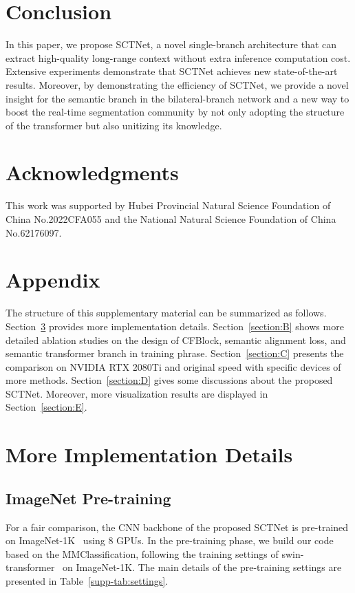 \documentclass[letterpaper]{article} %
\begin{document}
\section{Conclusion}
In this paper, we propose SCTNet, a novel single-branch architecture that can extract high-quality long-range context without extra inference computation cost. Extensive experiments demonstrate that SCTNet achieves new state-of-the-art results. Moreover, by demonstrating the efficiency of SCTNet, we provide a novel insight for the semantic branch in the bilateral-branch network and a new way to boost the real-time segmentation community by not only adopting the structure of the transformer but also unitizing its knowledge.

\section{Acknowledgments}
This work was supported by Hubei Provincial Natural Science Foundation of China No.2022CFA055 and the National Natural Science Foundation of China No.62176097.



\newpage
\appendix


\section*{Appendix} 
The structure of this supplementary material can be summarized as follows. Section~\ref{section:A} provides more implementation details. Section~\ref{section:B} shows more detailed ablation studies on the design of CFBlock, semantic alignment loss, and semantic transformer branch in training phrase. Section~\ref{section:C} presents the comparison on NVIDIA RTX 2080Ti and original speed with specific devices of more methods. Section~\ref{section:D} gives some discussions about the proposed SCTNet. Moreover, more visualization results are displayed in Section~\ref{section:E}.

\section{More Implementation Details}\label{section:A}
\subsection{ImageNet Pre-training}
For a fair comparison, the CNN backbone of the proposed SCTNet is pre-trained on ImageNet-1K~\cite{deng2009imagenet} using 8 GPUs. In the pre-training phase, we build our code based on the MMClassification, following the training settings of swin-transformer~\cite{liu2021swin} on ImageNet-1K. The main details of the pre-training settings are presented in Table~\ref{supp-tab:settings}.
\end{document}
